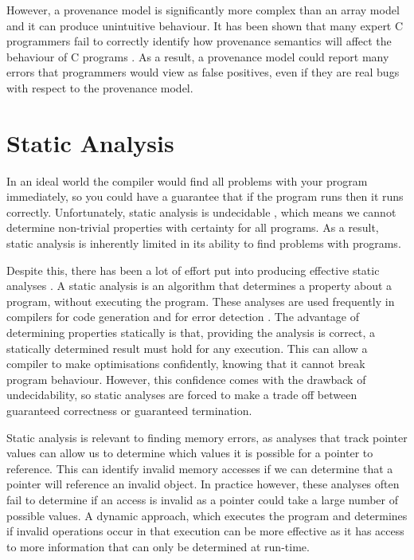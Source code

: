 \documentclass[12pt,twoside]{report}
\begin{document}
However, a provenance model is significantly more complex than an array model and it can produce unintuitive behaviour. It has been shown that many expert C programmers fail to correctly identify how provenance semantics will affect the behaviour of C programs \cite{can't find the reference for this}. As a result, a provenance model could report many errors that programmers would view as false positives, even if they are real bugs with respect to the provenance model.

\section{Static Analysis}
In an ideal world the compiler would find all problems with your program immediately, so you could have a guarantee that if the program runs then it runs correctly. Unfortunately, static analysis is undecidable \cite{10.1145/161494.161501}, which means we cannot determine non-trivial properties with certainty for all programs. As a result, static analysis is inherently limited in its ability to find problems with programs.

Despite this, there has been a lot of effort put into producing effective static analyses \cite{johnson1977lint,bushstaticanalysis,wilson1995efficient}. A static analysis is an algorithm that determines a property about a program, without executing the program. These analyses are used frequently in compilers for code generation \cite{wilson1995efficient} and for error detection \cite{bushstaticanalysis}. The advantage of determining properties statically is that, providing the analysis is correct, a statically determined result must hold for any execution. This can allow a compiler to make optimisations confidently, knowing that it cannot break program behaviour. However, this confidence comes with the drawback of undecidability, so static analyses are forced to make a trade off between guaranteed correctness or guaranteed termination.

Static analysis is relevant to finding memory errors, as analyses that track pointer values\cite{wilson1995efficient} can allow us to determine which values it is possible for a pointer to reference. This can identify invalid memory accesses if we can determine that a pointer will reference an invalid object. In practice however, these analyses often fail to determine if an access is invalid as a pointer could take a large number of possible values. A dynamic approach, which executes the program and determines if invalid operations occur in that execution can be more effective as it has access to more information that can only be determined at run-time.
\end{document}
